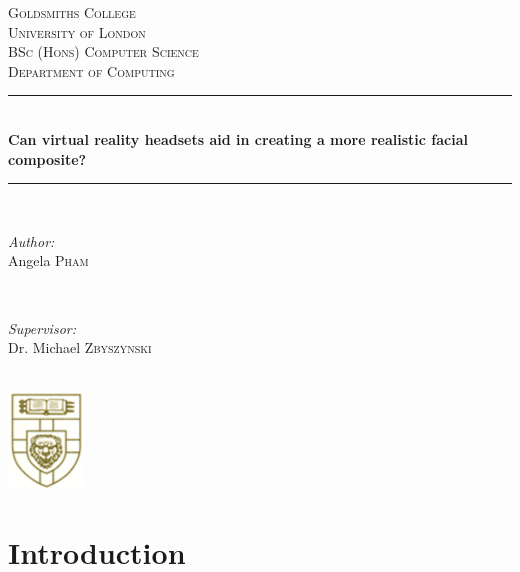 \documentclass[12pt]{report}
\date{}
\begin{document}
\begin{titlepage}
	\centering
	\newcommand{\HRule}{\rule{\linewidth}{0.5mm}}
	\textsc{\LARGE Goldsmiths College}\\
	\textsc{University of London}\\[1.5cm]
	\textsc{\Large BSc (Hons) Computer Science}\\
	\textsc{Department of Computing}\\[0.5cm] 
	
	
	\HRule \\[0.5cm]
	{ \huge \bfseries Can virtual reality headsets aid in creating a more realistic facial composite?}\\[0.4cm] %
	\HRule \\[1.5cm]
	
	\begin{minipage}{0.4\textwidth}
		\begin{flushleft} \large
			\emph{Author:}\\
			Angela \textsc{Pham} %
		\end{flushleft}
	\end{minipage}
	~
	\begin{minipage}{0.4\textwidth}
		\begin{flushright} \large
			\emph{Supervisor:} \\
			Dr. Michael \textsc{Zbyszynski} %
		\end{flushright}
	\end{minipage}\\[3.6cm]
\includegraphics[width=2cm]{logo.png}
\end{titlepage}


\renewcommand{\abstractname}{Acknowledgements}
\begin{abstract}
	...
\end{abstract}

\renewcommand{\abstractname}{Abstract}
\begin{abstract}
	...
\end{abstract}


\tableofcontents
\newpage
\listoffigures
\listoftables

\chapter{Introduction}
\end{document}
